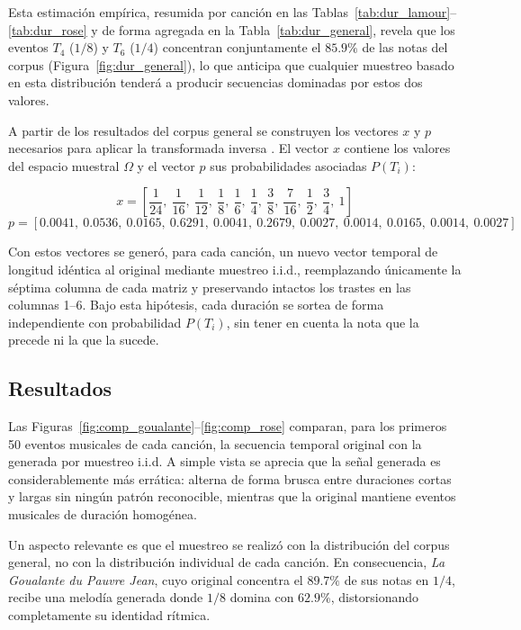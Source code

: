 \documentclass{article}
\theoremstyle{plain}
\theoremstyle{definition}
\begin{document}
Esta estimación empírica, resumida por canción en las
Tablas~\ref{tab:dur_lamour}--\ref{tab:dur_rose} y de forma agregada en la
Tabla~\ref{tab:dur_general}, revela que los eventos $T_4$ ($1/8$) y $T_6$ ($1/4$)
concentran conjuntamente el $85.9\%$ de las notas del corpus
(Figura~\ref{fig:dur_general}), lo que anticipa que cualquier muestreo basado en esta
distribución tenderá a producir secuencias dominadas por estos dos valores.

A partir de los resultados del corpus general se construyen los vectores $x$ y $p$
necesarios para aplicar la transformada inversa \cite{bertsekas}. El vector $x$ contiene
los valores del espacio muestral $\Omega$ y el vector $p$ sus probabilidades asociadas
$P(T_i)$:

\[
    x = \left[\frac{1}{24},\ \frac{1}{16},\ \frac{1}{12},\ \frac{1}{8},\ \frac{1}{6},\
               \frac{1}{4},\ \frac{3}{8},\ \frac{7}{16},\ \frac{1}{2},\ \frac{3}{4},\ 1\right]
\]
\[
    p = \left[0.0041,\ 0.0536,\ 0.0165,\ 0.6291,\ 0.0041,\ 0.2679,\ 0.0027,\ 0.0014,\
              0.0165,\ 0.0014,\ 0.0027\right]
\]

Con estos vectores se generó, para cada canción, un nuevo vector temporal de longitud
idéntica al original mediante muestreo i.i.d., reemplazando únicamente la séptima columna
de cada matriz y preservando intactos los trastes en las columnas 1--6. Bajo esta hipótesis,
cada duración se sortea de forma independiente con probabilidad $P(T_i)$, sin tener en
cuenta la nota que la precede ni la que la sucede.

\subsection*{Resultados}

Las Figuras~\ref{fig:comp_goualante}--\ref{fig:comp_rose} comparan, para los primeros 50 eventos musicales de cada canción, la secuencia temporal original con la generada por muestreo i.i.d. A simple
vista se aprecia que la señal generada es considerablemente más errática: alterna de forma
brusca entre duraciones cortas y largas sin ningún patrón reconocible, mientras que la
original mantiene eventos musicales de duración homogénea.

Un aspecto relevante es que el muestreo se realizó con la distribución del corpus
general, no con la distribución individual de cada canción. En consecuencia, \textit{La Goualante du Pauvre Jean}, cuyo original concentra el $89.7\%$ de sus notas en $1/4$, recibe una melodía generada donde $1/8$ domina con
$62.9\%$, distorsionando completamente su identidad rítmica.
\end{document}
